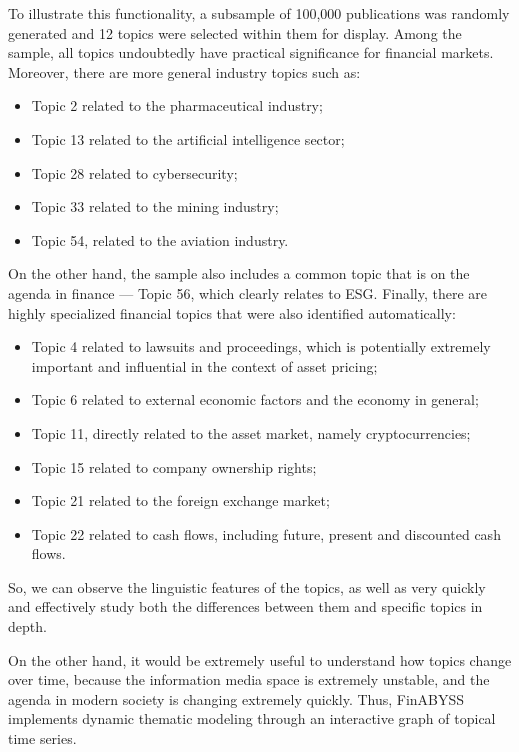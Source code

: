 To illustrate this functionality, a subsample of 100,000 publications was randomly generated and 12 topics
were selected within them for display. Among the sample, all topics undoubtedly have practical significance
for financial markets. Moreover, there are more general industry topics such as:

\begin{itemize}
    \item Topic 2 related to the pharmaceutical industry;
    \item Topic 13 related to the artificial intelligence sector;
    \item Topic 28 related to cybersecurity;
    \item Topic 33 related to the mining industry;
    \item Topic 54, related to the aviation industry.
\end{itemize}

On the other hand, the sample also includes a common topic that is on the agenda in finance --- Topic 56,
which clearly relates to ESG. Finally, there are highly specialized financial topics that were also identified
automatically:

\begin{itemize}
    \item Topic 4 related to lawsuits and proceedings, which is potentially extremely important and
    influential in the context of asset pricing;
    \item Topic 6 related to external economic factors and the economy in general;
    \item Topic 11, directly related to the asset market, namely cryptocurrencies;
    \item Topic 15 related to company ownership rights;
    \item Topic 21 related to the foreign exchange market;
    \item Topic 22 related to cash flows, including future, present and discounted
    cash flows.
\end{itemize}

So, we can observe the linguistic features of the topics, as well as very quickly and effectively study
both the differences between them and specific topics in depth.

On the other hand, it would be extremely useful to understand how topics change over time, because the information
media space is extremely unstable, and the agenda in modern society is changing extremely quickly. Thus, FinABYSS
implements dynamic thematic modeling through an interactive graph of topical time series.

